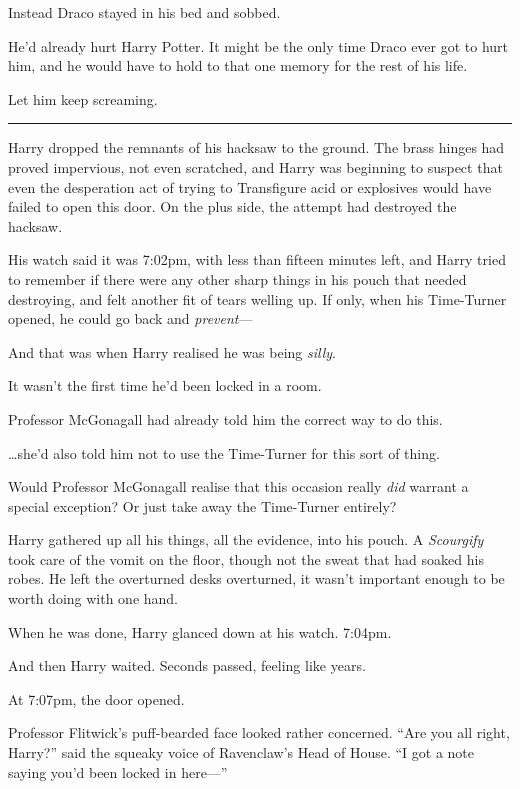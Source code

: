 Instead Draco stayed in his bed and sobbed.

He'd already hurt Harry Potter. It might be the only time Draco ever got
to hurt him, and he would have to hold to that one memory for the rest
of his life.

Let him keep screaming.

\begin{center}\rule{3in}{0.4pt}\end{center}

Harry dropped the remnants of his hacksaw to the ground. The brass
hinges had proved impervious, not even scratched, and Harry was
beginning to suspect that even the desperation act of trying to
Transfigure acid or explosives would have failed to open this door. On
the plus side, the attempt had destroyed the hacksaw.

His watch said it was 7:02pm, with less than fifteen minutes left, and
Harry tried to remember if there were any other sharp things in his
pouch that needed destroying, and felt another fit of tears welling up.
If only, when his Time-Turner opened, he could go back and
\emph{prevent}---

And that was when Harry realised he was being \emph{silly}.

It wasn't the first time he'd been locked in a room.

Professor McGonagall had already told him the correct way to do this.

\ldots{}she'd also told him not to use the Time-Turner for this sort of
thing.

Would Professor McGonagall realise that this occasion really \emph{did}
warrant a special exception? Or just take away the Time-Turner entirely?

Harry gathered up all his things, all the evidence, into his pouch. A
\emph{Scourgify} took care of the vomit on the floor, though not the
sweat that had soaked his robes. He left the overturned desks
overturned, it wasn't important enough to be worth doing with one hand.

When he was done, Harry glanced down at his watch. 7:04pm.

And then Harry waited. Seconds passed, feeling like years.

At 7:07pm, the door opened.

Professor Flitwick's puff-bearded face looked rather concerned. ``Are
you all right, Harry?'' said the squeaky voice of Ravenclaw's Head of
House. ``I got a note saying you'd been locked in here---''
